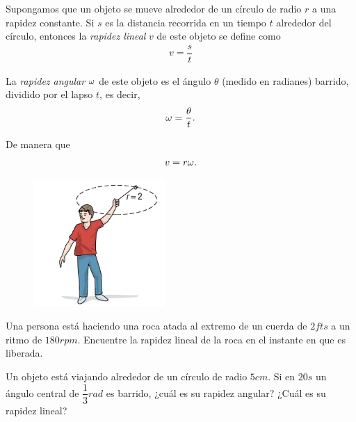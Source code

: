 {}
	Supongamos que un objeto se mueve alrededor de un círculo de radio $r$ a una rapidez constante. Si $s$ es la distancia recorrida en un tiempo $t$ alrededor del círculo, entonces la \emph{rapidez lineal} $v$ de este objeto se define como
	\begin{align}
		\label{sull6109}
		v=\dfrac{s}{t}
	\end{align}

{}
	La \emph{rapidez angular} $\omega$ de este objeto es el ángulo $\theta$ (medido en radianes) barrido, dividido por el lapso $t$, es decir, 
	\begin{align}
		\label{sull6110}
		\omega=\dfrac{\theta}{t}.
	\end{align}
	
	De manera que 
	\begin{align}
		\label{sull6111}
		v = r\omega.
	\end{align}

{}
	\begin{figure}
		\centering
		\includegraphics[width=5cm,keepaspectratio=true]{./trig/sull6117.png}
		\label{fig:6117}
	\end{figure}
	\begin{problema}
		\label{exmp:6108}
		Una persona está haciendo una roca atada al extremo de un cuerda de $2fts$ a un ritmo de $180rpm$. Encuentre la rapidez lineal de la roca en el instante en que es liberada.
	\end{problema}
	

{}
	\begin{problema}
		\label{exe:sull6197}
		Un objeto está viajando alrededor de un círculo de radio $5cm$. Si en $20s$ un ángulo central de $\dfrac{1}{3}rad$ es barrido, ¿cuál es su rapidez angular? ¿Cuál es su rapidez lineal?
	\end{problema}
	


